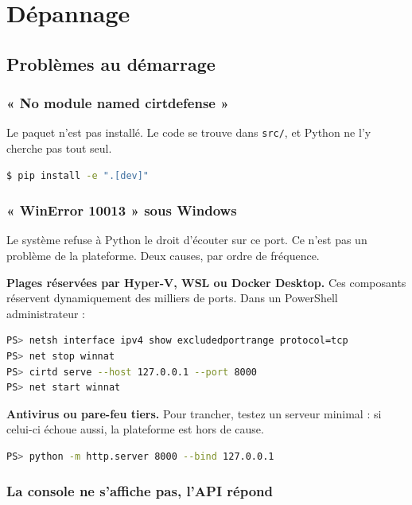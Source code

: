 \chapter{Dépannage}
\minitoc

\section{Problèmes au démarrage}

\subsection{« No module named cirtdefense »}

Le paquet n'est pas installé. Le code se trouve dans \texttt{src/}, et Python
ne l'y cherche pas tout seul.

\begin{lstlisting}[language=bash]
$ pip install -e ".[dev]"
\end{lstlisting}

\subsection{« WinError 10013 » sous Windows}

Le système refuse à Python le droit d'écouter sur ce port. Ce n'est pas un
problème de la plateforme. Deux causes, par ordre de fréquence.

\textbf{Plages réservées par Hyper-V, WSL ou Docker Desktop.} Ces composants
réservent dynamiquement des milliers de ports. Dans un PowerShell
administrateur :

\begin{lstlisting}[language=bash]
PS> netsh interface ipv4 show excludedportrange protocol=tcp
PS> net stop winnat
PS> cirtd serve --host 127.0.0.1 --port 8000
PS> net start winnat
\end{lstlisting}

\textbf{Antivirus ou pare-feu tiers.} Pour trancher, testez un serveur
minimal : si celui-ci échoue aussi, la plateforme est hors de cause.

\begin{lstlisting}[language=bash]
PS> python -m http.server 8000 --bind 127.0.0.1
\end{lstlisting}

\subsection{La console ne s'affiche pas, l'API répond}


